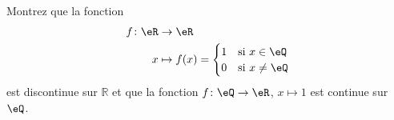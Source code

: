
\begin{exercice}\label{exo0037}

Montrez que la fonction
\begin{equation}
	\begin{aligned}
		f\colon \eR&\to \eR \\
		x&\mapsto f(x)=\begin{cases}
	1	&	\text{si }x\in\eQ\\
	0	&	 \text{si }x\neq\eQ
\end{cases}
\end{aligned}
\end{equation}
est discontinue sur $\mathbb{R}$ et que la fonction $f\colon \eQ\to \eR$, $x\mapsto 1$ est continue sur $\eQ$.

\end{exercice}

